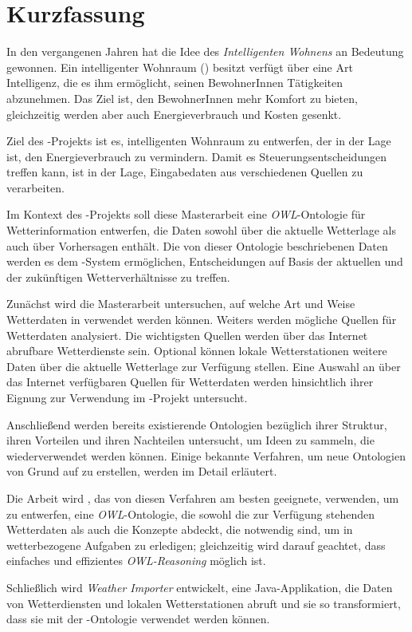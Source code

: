 \chapter*{Kurzfassung}

In den vergangenen Jahren hat die Idee des \emph{Intelligenten Wohnens} an Bedeutung gewonnen. Ein intelligenter Wohnraum (\smarthome) besitzt verfügt über eine Art Intelligenz, die es ihm ermöglicht, seinen BewohnerInnen Tätigkeiten abzunehmen. Das Ziel ist, den BewohnerInnen mehr Komfort zu bieten, gleichzeitig werden aber auch Energieverbrauch und Kosten gesenkt.

Ziel des \thinkhome-Projekts ist es, intelligenten Wohnraum zu entwerfen, der in der Lage ist, den Energieverbrauch zu vermindern. Damit es Steuerungsentscheidungen treffen kann, ist \thinkhome in der Lage, Eingabedaten aus verschiedenen Quellen zu verarbeiten.

Im Kontext des \thinkhome-Projekts soll diese Masterarbeit eine \emph{OWL}-Ontologie für Wetterinformation entwerfen, die Daten sowohl über die aktuelle Wetterlage als auch über Vorhersagen enthält. Die von dieser Ontologie beschriebenen Daten werden es dem \thinkhome-System ermöglichen, Entscheidungen auf Basis der aktuellen und der zukünftigen Wetterverhältnisse zu treffen.

Zunächst wird die Masterarbeit untersuchen, auf welche Art und Weise Wetterdaten in \thinkhome verwendet werden können. Weiters werden mögliche Quellen für Wetterdaten analysiert. Die wichtigsten Quellen werden über das Internet abrufbare Wetterdienste sein. Optional können lokale Wetterstationen weitere Daten über die aktuelle Wetterlage zur Verfügung stellen. Eine Auswahl an über das Internet verfügbaren Quellen für Wetterdaten werden hinsichtlich ihrer Eignung zur Verwendung im \thinkhome-Projekt untersucht.

Anschließend werden bereits existierende Ontologien bezüglich ihrer Struktur, ihren Vorteilen und ihren Nachteilen untersucht, um Ideen zu sammeln, die wiederverwendet werden können. Einige bekannte Verfahren, um neue Ontologien von Grund auf zu erstellen, werden im Detail erläutert.

Die Arbeit wird \methontology, das von diesen Verfahren am besten geeignete, verwenden, um \thinkhomeweather zu entwerfen, eine \textit{OWL}-Ontologie, die sowohl die zur Verfügung stehenden Wetterdaten als auch die Konzepte abdeckt, die notwendig sind, um in \thinkhome wetterbezogene Aufgaben zu erledigen; gleichzeitig wird darauf geachtet, dass einfaches und effizientes \emph{OWL-Reasoning} möglich ist.

Schließlich wird \emph{Weather Importer} entwickelt, eine Java-Applikation, die Daten von Wetterdiensten und lokalen Wetterstationen abruft und sie so transformiert, dass sie mit der \thinkhomeweather-Ontologie verwendet werden können.